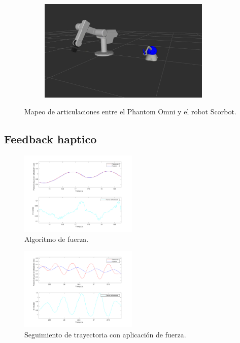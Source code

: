 \begin{figure}[H]
\begin{subfigure}[b]{0.35\textwidth}
    \caption{}
  \end{subfigure}%
  \quad
  \begin{subfigure}[b]{0.35\textwidth}
    \includegraphics[width=0.9\textwidth]{img/cap5/mapping_04}
    \caption{}
  \end{subfigure}
  \caption{Mapeo de articulaciones entre el Phantom Omni y el robot Scorbot.}
  \label{cap5_joint_mapping}
\end{figure}


\subsection{Feedback haptico}

\begin{figure}[H]
  \centering
  \includegraphics[width=0.5\textwidth]{img/cap5/feedback_basico}
  \caption{Algoritmo de fuerza.}
  \label{cap5_feedback_basico}
\end{figure}


\begin{figure}[H]
  \centering
  \includegraphics[width=0.5\textwidth]{img/cap5/feedback_velocidad}
  \caption{Seguimiento de trayectoria con aplicación de fuerza.}
  \label{cap4_force_tracking}
\end{figure}




